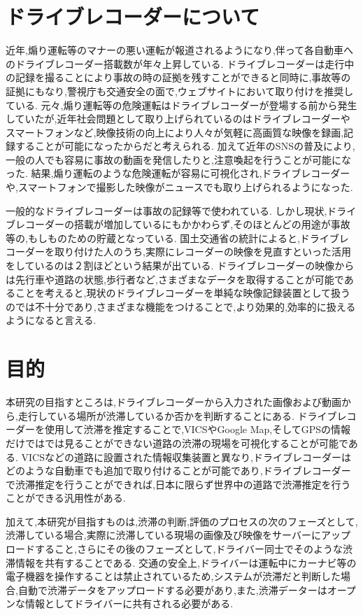 \section{ドライブレコーダーについて}
近年,煽り運転等のマナーの悪い運転が報道されるようになり,伴って各自動車へのドライブレコーダー搭載数が年々上昇している.
ドライブレコーダーは走行中の記録を撮ることにより事故の時の証拠を残すことができると同時に,事故等の証拠にもなり,警視庁も交通安全の面で,ウェブサイトにおいて取り付けを推奨している.
元々,煽り運転等の危険運転はドライブレコーダーが登場する前から発生していたが,近年社会問題として取り上げられているのはドライブレコーダーやスマートフォンなど,映像技術の向上により人々が気軽に高画質な映像を録画,記録することが可能になったからだと考えられる.
加えて近年のSNSの普及により,一般の人でも容易に事故の動画を発信したりと,注意喚起を行うことが可能になった.
結果,煽り運転のような危険運転が容易に可視化され,ドライブレコーダーや,スマートフォンで撮影した映像がニュースでも取り上げられるようになった.

一般的なドライブレコーダーは事故の記録等で使われている.
しかし現状,ドライブレコーダーの搭載が増加しているにもかかわらず,そのほとんどの用途が事故等の,もしものための貯蔵となっている.
国土交通省の統計によると,ドライブレコーダーを取り付けた人のうち,実際にレコーダーの映像を見直すといった活用をしているのは２割ほどという結果が出ている\cite{ministryofland}.
ドライブレコーダーの映像からは先行車や道路の状態,歩行者など,さまざまなデータを取得することが可能であることを考えると,現状のドライブレコーダーを単純な映像記録装置として扱うのでは不十分であり,さまざまな機能をつけることで,より効果的,効率的に扱えるようになると言える.

\section{目的}
本研究の目指すところは,ドライブレコーダーから入力された画像および動画から,走行している場所が渋滞しているか否かを判断することにある.
ドライブレコーダーを使用して渋滞を推定することで,VICSやGoogle Map,そしてGPSの情報だけではでは見ることができない道路の渋滞の現場を可視化することが可能である.
VICSなどの道路に設置された情報収集装置と異なり,ドライブレコーダーはどのような自動車でも追加で取り付けることが可能であり,ドライブレコーダーで渋滞推定を行うことができれば,日本に限らず世界中の道路で渋滞推定を行うことができる汎用性がある.

加えて,本研究が目指すものは,渋滞の判断,評価のプロセスの次のフェーズとして,渋滞している場合,実際に渋滞している現場の画像及び映像をサーバーにアップロードすること,さらにその後のフェーズとして,ドライバー同士でそのような渋滞情報を共有することである.
交通の安全上,ドライバーは運転中にカーナビ等の電子機器を操作することは禁止されているため,システムが渋滞だと判断した場合,自動で渋滞データをアップロードする必要があり,また,渋滞データーはオープンな情報としてドライバーに共有される必要がある.


